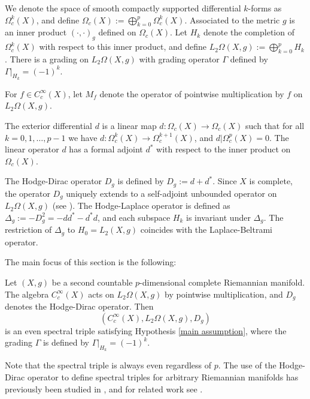     We denote the space of smooth compactly supported differential $k$-forms as $\Omega_c^k(X)$, and define $\Omega_c(X) := \bigoplus_{k=0}^p \Omega_c^k(X)$.
    Associated to the metric $g$ is an inner product $(\cdot,\cdot)_g$ defined on $\Omega_c(X)$.
    Let $H_k$ denote the completion of $\Omega^k_c(X)$ with respect to this inner product, and define $L_2\Omega(X,g) := \bigoplus_{k=0}^p H_k$.
    There is a grading on $L_2\Omega(X,g)$ with grading operator $\Gamma$ defined by $\Gamma|_{H_k} = (-1)^k$.
    
    For $f \in C^\infty_c(X)$, let $M_f$ denote the operator of pointwise multiplication by $f$ on $L_2\Omega(X,g)$.
    
    The exterior differential $d$ is a linear map $d:\Omega_c(X)\to\Omega_c(X)$ such that for all $k = 0,1,\ldots,p-1$
    we have
    $d:\Omega^{k}_c(X)\to \Omega^{k+1}_c(X)$, and $d|\Omega^p_c(X) = 0$. The linear operator $d$ has a formal
    adjoint $d^*$ with respect to the inner product on $\Omega_c(X)$.
    
    The Hodge-Dirac operator $D_g$ is defined by $D_g := d+d^*$. Since $X$ is complete, the operator $D_g$ uniquely extends to a self-adjoint unbounded operator on $L_2\Omega(X,g)$ (see \cite{chernov}). The Hodge-Laplace operator is defined as $\Delta_g := -D_g^2 = -dd^*-d^*d$, and each subspace $H_k$
    is invariant under $\Delta_g$. The restriction of $\Delta_g$ to $H_0 = L_2(X,g)$ coincides with the Laplace-Beltrami operator.
    
    The main focus of this section is the following:
    \begin{thm}\label{manifold theorem} 
        Let $(X,g)$ be a second countable $p$-dimensional complete Riemannian manifold. The algebra $C^\infty_c(X)$ acts on $L_2\Omega(X,g)$ by pointwise multiplication, and $D_g$ denotes
        the Hodge-Dirac operator. Then
        \begin{equation*}
            (C^\infty_c(X),L_2\Omega(X,g),D_g)
        \end{equation*}
        is an even spectral triple satisfying Hypothesis \ref{main assumption}, where the grading $\Gamma$ is defined by $\Gamma|_{H_k} = (-1)^k$.
    \end{thm}
    
    Note that the spectral triple is always even regardless of $p$. The use of the Hodge-Dirac operator to define spectral triples for arbitrary Riemannian manifolds has previously been studied in \cite{Lord-Rennie-Varilly}, and for related work see \cite{Frohlich-Grandjean-Recknagel}.
    
